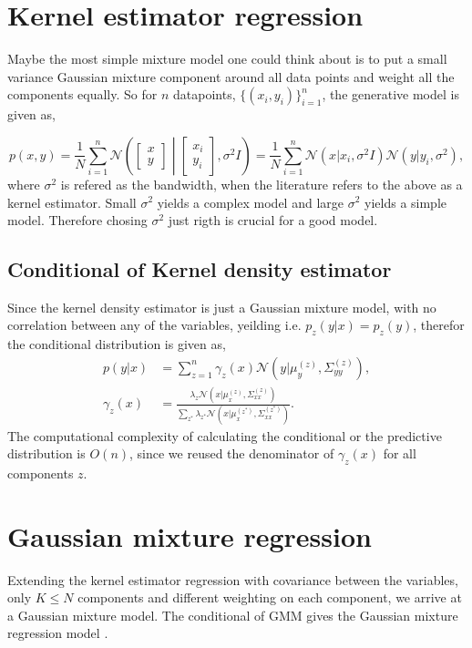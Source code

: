 \section{Kernel estimator regression}
Maybe the most simple mixture model one could think about is to put a small variance Gaussian mixture
component around all data points and weight all the components equally. So for $n$ datapoints,
$\{(x_i,y_i)\}_{i=1}^n$, the generative model is given as, 

$$p(x,y) = \frac{1}{N} \sum_{i=1}^n \mathcal{N}\left(\begin{bmatrix}x\\y\end{bmatrix} \middle|
\begin{bmatrix}x_i\\y_i\end{bmatrix}, \sigma^2 I \right) = \frac{1}{N} \sum_{i=1}^n 
\mathcal{N}(x|x_i, \sigma^2 I)\mathcal{N}(y|y_i, \sigma^2),$$
where $\sigma^2$ is refered as the bandwidth, when the literature refers to the above as a kernel estimator. 
Small $\sigma^2$ yields a complex model and large $\sigma^2$ yields a simple model. Therefore chosing $\sigma^2$
just rigth is crucial for a good model. 


\subsection{Conditional of Kernel density estimator}
Since the kernel density estimator is just a Gaussian mixture model, with no correlation between
any of the variables, yeilding i.e. $p_z(y|x) = p_z(y)$, therefor the conditional distribution is
given as, 
\begin{align}
    p(y|x) &= \sum_{z=1}^n \gamma_z(x) \mathcal{N}(y|\mu_{y}^{(z)},\Sigma_{yy}^{(z)} ),\\
    \gamma_z(x) &= \frac{\lambda_z \mathcal{N}(x|\mu_{x}^{(z)},\Sigma_{xx}^{(z)})}{\sum_{z^*}
\lambda_{z^*} \mathcal{N}(x|\mu_{x}^{(z^*)},\Sigma_{xx}^{(z^*)})}.
\end{align}
The computational complexity of calculating the conditional or the predictive distribution is
$O(n)$, since we reused the denominator of $\gamma_z(x)$ for all components $z$. 

\section{Gaussian mixture regression}
Extending the kernel estimator regression with covariance between the variables, only $K \leq N$ components 
and different weighting on each component, we arrive at a Gaussian mixture model. The conditional of GMM 
gives the Gaussian mixture regression model \cite{GMR}. 

